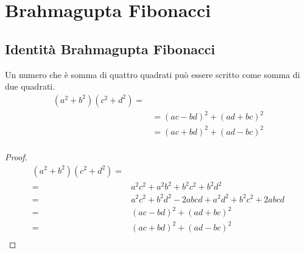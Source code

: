\chapter{Brahmagupta Fibonacci}
\section{Identità Brahmagupta Fibonacci}
\begin{thm}
Un numero che è somma di quattro quadrati può essere scritto come somma di due quadrati.
	\begin{align*}
	(a^2+b^2)(c^2+d^2)=&\\
	&=(ac-bd)^2+(ad+bc)^2\\
	&=(ac+bd)^2+(ad-bc)^2\\
	\end{align*}
\end{thm}
\begin{proof}
\begin{align*}
	(a^2+b^2)(c^2+d^2)=&\\
	=&a^2c^2+a^2b^2+b^2c^2+b^2d^2\\
	=&a^2c^2+b^2d^2-2abcd+a^2d^2+b^2c^2+2abcd\\
	=&(ac-bd)^2+(ad+bc)^2\\
	=&(ac+bd)^2+(ad-bc)^2\\
\end{align*}
\end{proof}